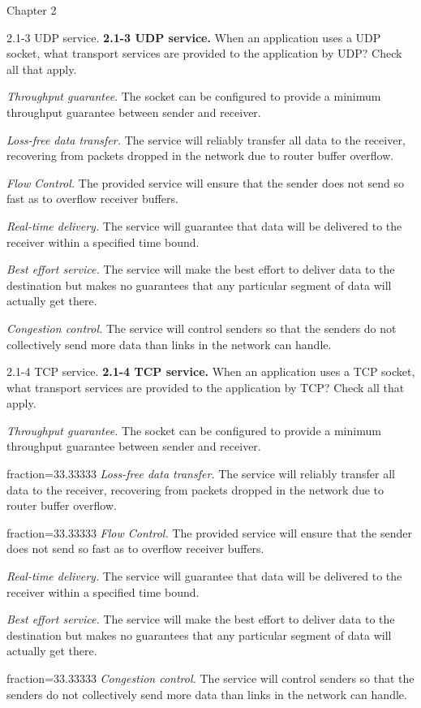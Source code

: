 \documentclass[11pt]{article}
\begin{document}
\begin{quiz}{Chapter 2}
\begin{multi}[points=1,shuffle,multiple]{2.1-3 UDP service.}
\textbf{2.1-3 UDP service.} When an application uses a UDP socket, what transport services are provided to the application by UDP? Check all that apply.
\item \emph{Throughput guarantee}. The socket can be configured to provide a minimum throughput guarantee between sender and receiver.
\item \emph{Loss-free data transfer.} The service will reliably transfer all data to the receiver, recovering from packets dropped in the network due to router buffer overflow.
\item \emph{Flow Control.} The provided service will ensure that the sender does not send so fast as to overflow receiver buffers.
\item \emph{Real-time delivery.} The service will guarantee that data will be delivered to the receiver within a specified time bound.
\item* \emph{Best effort service.} The service will make the best effort to deliver data to the destination but makes no guarantees that any particular segment of data will actually get there.
\item \emph{Congestion control.} The service will control senders so that the senders do not collectively send more data than links in the network can handle.
\end{multi}

\begin{multi}[points=1,shuffle,multiple]{2.1-4 TCP service.}
\textbf{2.1-4 TCP service.} When an application uses a TCP socket, what transport services are provided to the application by TCP? Check all that apply.
\item \emph{Throughput guarantee.} The socket can be configured to provide a minimum throughput guarantee between sender and receiver.
\item[fraction=33.33333] \emph{Loss-free data transfer.} The service will reliably transfer all data to the receiver, recovering from packets dropped in the network due to router buffer overflow.
\item[fraction=33.33333] \emph{Flow Control.} The provided service will ensure that the sender does not send so fast as to overflow receiver buffers.
\item \emph{Real-time delivery.} The service will guarantee that data will be delivered to the receiver within a specified time bound.
\item \emph{Best effort service.} The service will make the best effort to deliver data to the destination but makes no guarantees that any particular segment of data will actually get there.
\item[fraction=33.33333] \emph{Congestion control.} The service will control senders so that the senders do not collectively send more data than links in the network can handle.
\end{multi}


\end{quiz}
\end{document}
